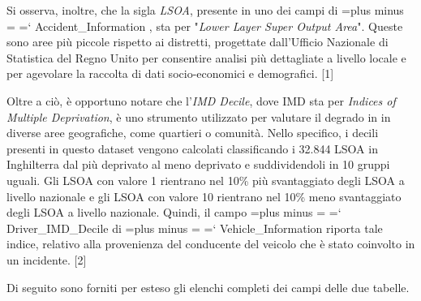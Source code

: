 \documentclass{article}
\renewcommand {\texttt}[1]{%
  \begingroup
    \spaceskip=\fontdimen2\font plus \fontdimen3\font minus \fontdimen4\font
    \xspaceskip=\fontdimen7\font\relax
    \ttfamily
    \hyphenchar\font=`\-
    #1
  \endgroup
}
\begin{document}
Si osserva, inoltre, che la sigla \textit{LSOA}, presente in uno dei campi di \texttt{Accident\_Information}, sta per "\textit{Lower Layer Super Output Area}". Queste sono aree più piccole rispetto ai distretti, progettate dall'Ufficio Nazionale di Statistica del Regno Unito per consentire analisi più dettagliate a livello locale e per agevolare la raccolta di dati socio-economici e demografici. [1]

Oltre a ciò, è opportuno notare che l'\textit{IMD Decile}, dove IMD sta per \textit{Indices of Multiple Deprivation}, è uno strumento utilizzato per valutare il degrado in in diverse aree geografiche, come quartieri o comunità. Nello specifico, i decili presenti in questo dataset vengono calcolati classificando i 32.844 LSOA in Inghilterra dal più deprivato al meno deprivato e suddividendoli in 10 gruppi uguali. Gli LSOA con valore 1 rientrano nel 10\% più svantaggiato degli LSOA a livello nazionale e gli LSOA con valore 10 rientrano nel 10\% meno svantaggiato degli LSOA a livello nazionale. Quindi, il campo \texttt{Driver\_IMD\_Decile} di \texttt{Vehicle\_Information} riporta tale indice, relativo alla provenienza del conducente del veicolo che è stato coinvolto in un incidente. [2]

Di seguito sono forniti per esteso gli elenchi completi dei campi delle due tabelle.
\end{document}

